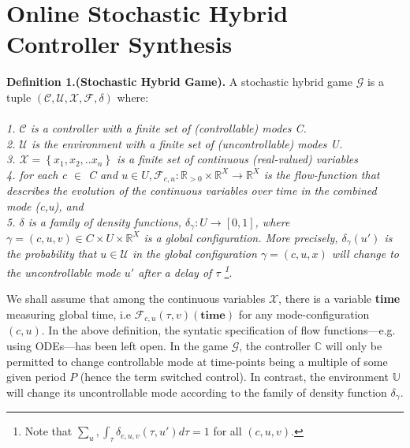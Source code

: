 \section{Online Stochastic Hybrid Controller Synthesis}
    \label{sec:onlinestochastichybridcontroller}
    \textbf{Definition 1.(Stochastic Hybrid Game).} A stochastic hybrid game $\mathcal{G}$ is a
    tuple $(\mathcal{C,U,X,F},\delta)$ where:
    \\
    \\
    \emph{1. $\mathcal{C}$ is a controller with a finite set of (controllable) modes C.} \\
    \emph{2. $\mathcal{U}$ is the environment with a finite set of (uncontrollable) modes U.} \\
    \emph{3. $\mathcal{X} = \left\lbrace x_1,x_2,..x_n \right\rbrace$ is a finite set of
    continuous (real-valued) variables } \\
    \emph{4. for each c $\in$ C and $u \in U, \mathcal{F}_{c,u} : \mathbb{R}_{>0}
      \times \mathbb{R}^X \rightarrow\mathbb{R}^X$ 
        is the flow-function that describes the evolution of the continuous variables
        over time in the combined mode (c,u), and} \\
    \emph{5. $\delta$ is a family of density functions, $\delta_\gamma: 
    U \rightarrow 
    [0,1]$, where $ \gamma = (c,u,v) \in C \times U
    \times \mathbb{R}^X$ is a global configuration.
    More precisely, $\delta_{\gamma}(u')$ is the probability that $u \in \mathcal{U}$
    in the global configuration $ \gamma = (c,u,x)$ will change to the
      uncontrollable mode $u'$ after a delay of $\tau$ 
      \footnote{Note that $\sum_u,\int_{\tau}\delta_{c,u,v}(\tau,u')d\tau = 1$ for all $(c,u,v)$.}}.

    We shall assume that among the continuous variables $\mathcal{X}$, there is a variable
    \textbf{time} measuring global time, i.e $\mathcal{F}_{c,u}(\tau,v)(\textbf{time})$ 
    for any mode-configuration $(c,u)$. In the above definition, the syntatic specification
    of flow functions---e.g. using ODEs---has been left open. In the game $\mathcal{G}$,
    the controller $\mathbb{C}$ will only be permitted to change controllable mode at time-points
    being a multiple of some given period $P$ (hence the term switched control). In contrast,
    the environment $\mathbb{U}$ will change its uncontrollable mode according to the 
    family of density function $\delta_\gamma$.
    
